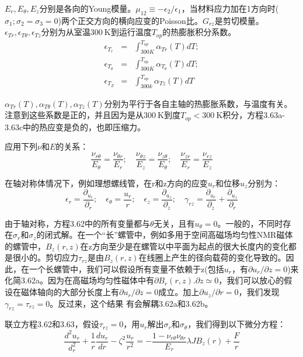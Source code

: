 $E_r, E_\theta, E_z$分别是各向的Young模量。$\mu_{12}\equiv -\epsilon_2/\epsilon_1$，当材料应力加在1方向时($\sigma_1;\sigma_2=\sigma_3=0$)两个正交方向的横向应变的Poisson比。$G_{rz}$是剪切模量。 
$\epsilon_{Tr},\epsilon_{T\theta},\epsilon_{Tz}$分别为从室温$300\ \mathrm{K}$到运行温度$T_{op}$的热膨胀积分系数。
\begin{eqnarray}
\epsilon_{T_r}&=&\int_{300K}^{T_{op}}\alpha_{Tr}(T)dT;\\ \nonumber
\epsilon_{T_\theta}&=&\int_{300K}^{T_{op}}\alpha_{T_\theta}(T)dT;\\ \nonumber
 \epsilon_{T_Z}&=&\int_{300k}^{T_{op}}\alpha_{Tz}(T)dT
\end{eqnarray}

$\alpha_{Tr}(T),\alpha_{T\theta}(T),\alpha_{Tz}(T)$分别为平行于各自主轴的热膨胀系数，与温度有关。
注意到这些系数是正的，并且因为是从$300\ \mathrm{K}$到度$T_{op}<300\ \mathrm{K}$积分，方程3.63a-3.63c中的热应变是负的，也即压缩力。

应用下列$\nu$和$E$的关系：
\begin{equation}
\frac{\nu_{r\theta}}{E_\theta}=\frac{\nu_{\theta r}}{E_r};\quad \frac{\nu_{\theta z}}{E_z}=\frac{\nu_{z\theta}}{E_\theta};\quad \frac{\nu_{zr}}{E_r}=\frac{\nu_{rz}}{E_z}
\end{equation}

在轴对称体情况下，例如理想螺线管，在r和z方向的应变$u_r$和位移$u_z$分别为：
\begin{equation}
\epsilon_r=\frac{\partial_{u_r}}{\partial_r};\quad \epsilon_\theta=\frac{u_r}{r};\quad \epsilon_z=\frac{\partial_{u_z}}{\partial_z};\quad \gamma_{rz}=\frac{\partial_{u_r}}{\partial_z}+\frac{\partial_{u_z}}{\partial_r}
\end{equation}

由于轴对称，方程3.62中的所有变量都与$\theta$无关，且有$u_\theta=0$。一般的，不同时存在$\sigma_r$和$\sigma_z$的闭式解。在一个“长”螺管中，例如多用于空间高磁场均匀性NMR磁体的螺管中，$B_z(r, z)$在z方向至少是在螺管以中平面为起点的很大长度内的变化都是很小的。剪切应力$\tau_{rz}$是由$B_z(r,z)$在线圈上产生的径向载荷的变化导致的。因此，在一个长螺管中，我们可以假设所有变量不依赖于z(包括$u_r$，有$\partial u_r/\partial z=0$)来化简3.62a。因为在高磁场均匀性磁体中有$\partial B_r(r,z).\partial z\simeq 0$，我们可以放心的假设在磁体轴向的大部分长度上有$\partial u_r/\partial z=0$成立。加上$\partial u_z/\partial r=0$，我们发现$\gamma_{rz}=\tau_{rz}=0$。反过来，这个结果 有会解耦3.62a和3.62b。

联立方程3.62和3.63，假设$\tau_{rz}=0$，用$u_r$解出$\sigma_r$和$\sigma_{\theta}$，我们得到以下微分方程：
\begin{equation}
\frac{d^2u_r}{d_r^2}+\frac{1}{r}\frac{du_r}{dr}-\zeta^2\frac{u_r}{r^2}=-\frac{1-\nu_{r\theta}\nu_{\theta r}}{E_r}\lambda JB_z(r)+\frac{F}{r}
\end{equation}

